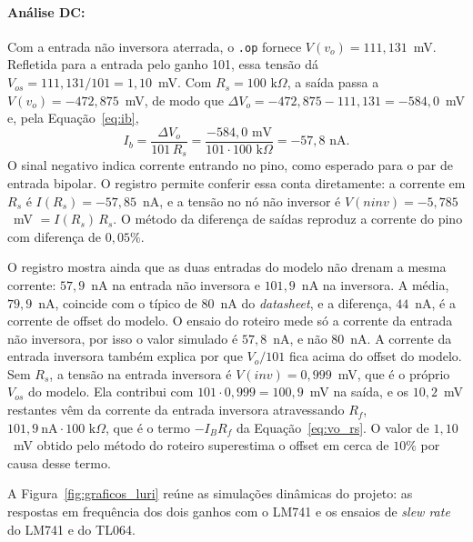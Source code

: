 \documentclass[11pt,a4paper]{article}
\begin{document}
\paragraph{Análise DC:}
Com a entrada não inversora aterrada, o \texttt{.op} fornece $V(v_o)=111{,}131$~mV. Refletida para a entrada pelo ganho 101, essa tensão dá $V_{os}=111{,}131/101=1{,}10$~mV. Com $R_s=100\text{ k}\Omega$, a saída passa a $V(v_o)=-472{,}875$~mV, de modo que $\Delta V_o=-472{,}875-111{,}131=-584{,}0$~mV e, pela Equação~\eqref{eq:ib},
\[
I_b=\frac{\Delta V_o}{101\,R_s}=\frac{-584{,}0\text{ mV}}{101\cdot100\text{ k}\Omega}=-57{,}8\text{ nA}.
\]
O sinal negativo indica corrente entrando no pino, como esperado para o par de entrada bipolar. O registro permite conferir essa conta diretamente: a corrente em $R_s$ é $I(R_s)=-57{,}85$~nA, e a tensão no nó não inversor é $V(\mathit{ninv})=-5{,}785$~mV $=I(R_s)\,R_s$. O método da diferença de saídas reproduz a corrente do pino com diferença de $0{,}05\%$.

O registro mostra ainda que as duas entradas do modelo não drenam a mesma corrente: $57{,}9$~nA na entrada não inversora e $101{,}9$~nA na inversora. A média, $79{,}9$~nA, coincide com o típico de $80$~nA do \textit{datasheet}, e a diferença, $44$~nA, é a corrente de offset do modelo. O ensaio do roteiro mede só a corrente da entrada não inversora, por isso o valor simulado é $57{,}8$~nA, e não $80$~nA. A corrente da entrada inversora também explica por que $V_o/101$ fica acima do offset do modelo. Sem $R_s$, a tensão na entrada inversora é $V(\mathit{inv})=0{,}999$~mV, que é o próprio $V_{os}$ do modelo. Ela contribui com $101\cdot0{,}999=100{,}9$~mV na saída, e os $10{,}2$~mV restantes vêm da corrente da entrada inversora atravessando $R_f$, $101{,}9~\text{nA}\cdot100\text{ k}\Omega$, que é o termo $-I_BR_f$ da Equação~\eqref{eq:vo_rs}. O valor de $1{,}10$~mV obtido pelo método do roteiro superestima o offset em cerca de $10\%$ por causa desse termo.

A Figura~\ref{fig:graficos_luri} reúne as simulações dinâmicas do projeto: as respostas em frequência dos dois ganhos com o LM741 e os ensaios de \textit{slew rate} do LM741 e do TL064.
\end{document}
